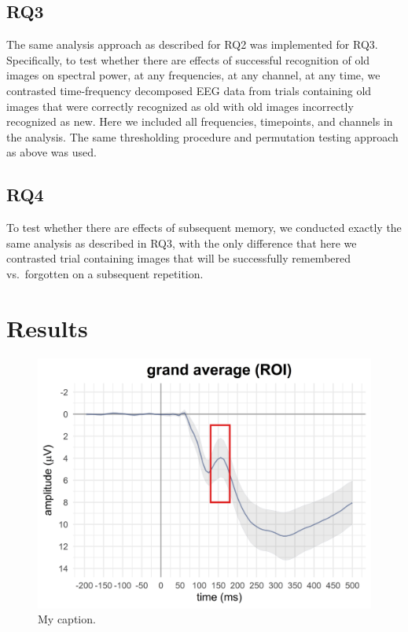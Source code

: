 \documentclass[
  man,floatsintext]{apa6}
\begin{document}
\hypertarget{rq3}{%
\subsection{RQ3}\label{rq3}}

The same analysis approach as described for RQ2 was implemented for RQ3. Specifically, to test whether there are effects of successful recognition of old images on spectral power, at any frequencies, at any channel, at any time, we contrasted time-frequency decomposed EEG data from trials containing old images that were correctly recognized as old with old images incorrectly recognized as new. Here we included all frequencies, timepoints, and channels in the analysis. The same thresholding procedure and permutation testing approach as above was used.

\hypertarget{rq4}{%
\subsection{RQ4}\label{rq4}}

To test whether there are effects of subsequent memory, we conducted exactly the same analysis as described in RQ3, with the only difference that here we contrasted trial containing images that will be successfully remembered vs.~forgotten on a subsequent repetition.

\hypertarget{results}{%
\section{Results}\label{results}}



\begin{figure}
\includegraphics[width=0.9\linewidth]{../results_in_repo/RQ1/timeseries_grand_average_ROI} \caption{My caption.}\label{fig:figure01}
\end{figure}
\end{document}
